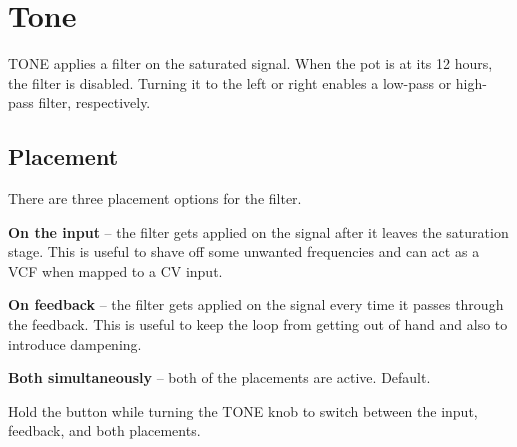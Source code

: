 \documentclass[11pt]{article}
\begin{document}
\begin{minipage}{0.05\textwidth}
\phantom{ }
\end{minipage}%
\begin{minipage}[t]{0.45\textwidth}
\setlength{\parskip}{6pt}

\section{Tone}

TONE applies a filter on the saturated signal. When the pot is at its 12 hours,
the filter is disabled. Turning it to the left or right enables a low-pass or
high-pass filter, respectively.

\subsection{Placement}

There are three placement options for the filter.

\textbf{On the input} -- the filter gets applied on the signal after it leaves
  the saturation stage. This is useful to shave off some unwanted frequencies
  and can act as a VCF when mapped to a CV input.

\textbf{On feedback} -- the filter gets applied on the signal every time it
  passes through the feedback. This is useful to keep the loop from getting out
  of hand and also to introduce dampening.

\textbf{Both simultaneously} -- both of the placements are active. Default.

Hold the button while turning the TONE knob to switch between the input,
feedback, and both placements.

\end{minipage}

\newpage
\end{document}
